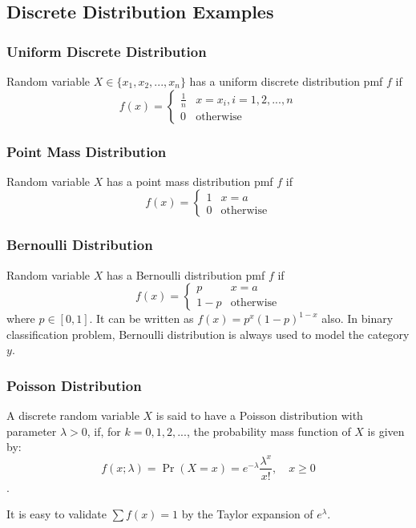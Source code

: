 \documentclass[11pt]{article}
\begin{document}
\subsection{Discrete Distribution Examples}
\subsubsection{Uniform Discrete Distribution}
Random variable $X \in \{x_1, x_2, ..., x_n\}$ has a uniform discrete distribution pmf $f$ if 
\[f(x) = \left\{\begin{array}{cc}
\frac{1}{n}  &  x = x_i, i = 1, 2, ..., n \\
0                &  \text{otherwise}
\end{array}
\right.\] 

\subsubsection{Point Mass Distribution}
Random variable $X$ has a point mass distribution pmf $f$ if 
\[f(x) = \left\{\begin{array}{cc}
1 & x= a \\
0 & \text{otherwise}
\end{array}
\right.
\]

\subsubsection{Bernoulli Distribution}
Random variable $X$ has a Bernoulli distribution pmf $f$ if 
\[f(x) = \left\{\begin{array}{cc}
p & x= a \\
1-p & \text{otherwise}
\end{array}
\right.
\]
where $p \in [0,1]$. It can be written as $f(x)=p^x(1-p)^{1-x}$ also. In binary classification problem, Bernoulli distribution is always used to model the category $y$.

\subsubsection{Poisson Distribution}
A discrete random variable $X$ is said to have a Poisson distribution with parameter $\lambda > 0$, 
if, for $k = 0, 1, 2, ...$, the probability mass function of $X$ is given by:
\[f(x; \lambda) = \Pr(X=x)= e^{-\lambda} \frac{\lambda^x }{x!},\quad x\ge 0\].

It is easy to validate $\sum{f(x)}=1$ by the Taylor expansion of $e^\lambda$.
\end{document}
